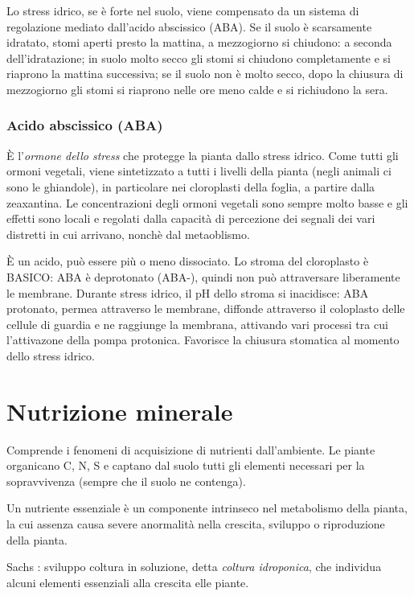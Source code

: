 \documentclass[a4paper,12pt]{book}
\begin{document}
Lo stress idrico, se è forte nel suolo, viene compensato da un sistema di regolazione mediato dall'acido abscissico (ABA). Se il suolo è scarsamente idratato, stomi aperti presto la mattina, a mezzogiorno si chiudono: a seconda dell'idratazione; in suolo molto secco gli stomi si chiudono completamente e si riaprono la mattina successiva; se il suolo non è molto secco, dopo la chiusura di mezzogiorno gli stomi si riaprono nelle ore meno calde e si richiudono la sera.

\subsection{Acido abscissico (ABA)}
È l'\emph{ormone dello stress} che protegge la pianta dallo stress idrico. Come tutti gli ormoni vegetali, viene sintetizzato a tutti i livelli della pianta (negli animali ci sono le ghiandole), in particolare nei cloroplasti della foglia, a partire dalla zeaxantina. Le concentrazioni degli ormoni vegetali sono sempre molto basse e gli effetti sono locali e regolati dalla capacità di percezione dei segnali dei vari distretti in cui arrivano, nonchè dal metaoblismo.

È un acido, può essere più o meno dissociato. Lo stroma del cloroplasto è BASICO: ABA è deprotonato (ABA-), quindi non può attraversare liberamente le membrane. Durante stress idrico, il pH dello stroma si inacidisce: ABA protonato, permea attraverso le membrane, diffonde attraverso il coloplasto delle cellule di guardia e ne raggiunge la membrana, attivando vari processi tra cui l'attivazone della pompa protonica.
Favorisce la chiusura stomatica al momento dello stress idrico.

\chapter{Nutrizione minerale}

Comprende i fenomeni di acquisizione di nutrienti dall'ambiente. Le piante organicano C, N, S e captano dal suolo tutti gli elementi necessari per la sopravvivenza (sempre che il suolo ne contenga).

Un nutriente essenziale è un componente intrinseco nel metabolismo della pianta, la cui assenza causa severe anormalità nella crescita, sviluppo o riproduzione della pianta.

Sachs : sviluppo coltura in soluzione, detta \emph{coltura idroponica}, che individua alcuni elementi essenziali alla crescita elle piante. 
\end{document}
